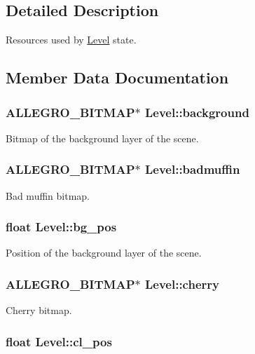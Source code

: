 \subsection{Detailed Description}
Resources used by \hyperlink{structLevel}{Level} state. 

\subsection{Member Data Documentation}
\hypertarget{structLevel_a4b4dd31284206502977b3d5b95d52abc}{
\subsubsection[{background}]{\setlength{\rightskip}{0pt plus 5cm}A\-L\-L\-E\-G\-R\-O\-\_\-\-B\-I\-T\-M\-A\-P$\ast$ Level\-::background}}\label{structLevel_a4b4dd31284206502977b3d5b95d52abc}
Bitmap of the background layer of the scene. \hypertarget{structLevel_addc469e6a9843c509fc640a4e625fa50}{
\subsubsection[{badmuffin}]{\setlength{\rightskip}{0pt plus 5cm}A\-L\-L\-E\-G\-R\-O\-\_\-\-B\-I\-T\-M\-A\-P$\ast$ Level\-::badmuffin}}\label{structLevel_addc469e6a9843c509fc640a4e625fa50}
Bad muffin bitmap. \hypertarget{structLevel_a00321214fdc30f67615053d1ca614948}{
\subsubsection[{bg\-\_\-pos}]{\setlength{\rightskip}{0pt plus 5cm}float Level\-::bg\-\_\-pos}}\label{structLevel_a00321214fdc30f67615053d1ca614948}
Position of the background layer of the scene. \hypertarget{structLevel_a6f99b0cb9d6bbba1fd903bc304205270}{
\subsubsection[{cherry}]{\setlength{\rightskip}{0pt plus 5cm}A\-L\-L\-E\-G\-R\-O\-\_\-\-B\-I\-T\-M\-A\-P$\ast$ Level\-::cherry}}\label{structLevel_a6f99b0cb9d6bbba1fd903bc304205270}
Cherry bitmap. \hypertarget{structLevel_af466533be369b5ce1f48196a7f3b7b0b}{
\subsubsection[{cl\-\_\-pos}]{\setlength{\rightskip}{0pt plus 5cm}float Level\-::cl\-\_\-pos}}\label{structLevel_af466533be369b5ce1f48196a7f3b7b0b}

